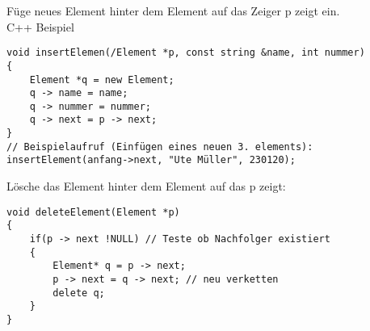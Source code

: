 Füge neues Element hinter dem Element auf das Zeiger p zeigt ein. \\
C++ Beispiel
\begin{lstlisting}
void insertElemen(/Element *p, const string &name, int nummer)
{
    Element *q = new Element;
    q -> name = name;
    q -> nummer = nummer;
    q -> next = p -> next;
}
// Beispielaufruf (Einfügen eines neuen 3. elements):
insertElement(anfang->next, "Ute Müller", 230120);
\end{lstlisting}
Lösche das Element hinter dem Element auf das p zeigt:
\begin{lstlisting}
void deleteElement(Element *p)
{
    if(p -> next !NULL) // Teste ob Nachfolger existiert
    {
        Element* q = p -> next;
        p -> next = q -> next; // neu verketten
        delete q;
    }
}
\end{lstlisting}
